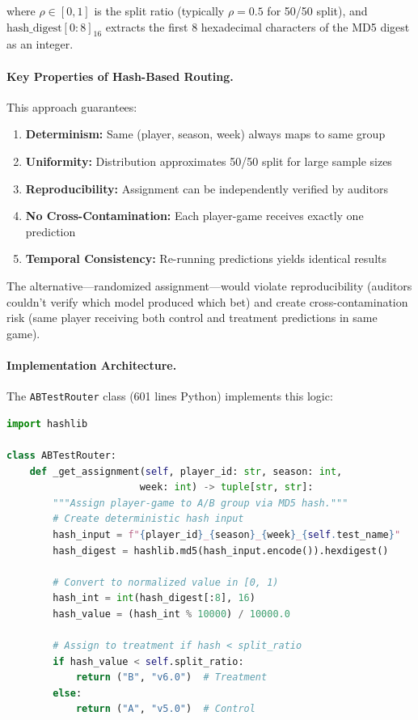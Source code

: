 where $\rho \in [0, 1]$ is the split ratio (typically $\rho = 0.5$ for 50/50 split), and $\text{hash\_digest}[0:8]_{16}$ extracts the first 8 hexadecimal characters of the MD5 digest as an integer.

\paragraph{Key Properties of Hash-Based Routing.}
This approach guarantees:

\begin{enumerate}[itemsep=2pt,parsep=0pt]
    \item \textbf{Determinism:} Same (player, season, week) always maps to same group
    \item \textbf{Uniformity:} Distribution approximates 50/50 split for large sample sizes
    \item \textbf{Reproducibility:} Assignment can be independently verified by auditors
    \item \textbf{No Cross-Contamination:} Each player-game receives exactly one prediction
    \item \textbf{Temporal Consistency:} Re-running predictions yields identical results
\end{enumerate}

The alternative---randomized assignment---would violate reproducibility (auditors couldn't verify which model produced which bet) and create cross-contamination risk (same player receiving both control and treatment predictions in same game).

\paragraph{Implementation Architecture.}
The \texttt{ABTestRouter} class (601 lines Python) implements this logic:

\begin{lstlisting}[language=Python, style=codestyle, caption={Deterministic A/B test assignment via MD5 hashing}]
import hashlib

class ABTestRouter:
    def _get_assignment(self, player_id: str, season: int,
                       week: int) -> tuple[str, str]:
        """Assign player-game to A/B group via MD5 hash."""
        # Create deterministic hash input
        hash_input = f"{player_id}_{season}_{week}_{self.test_name}"
        hash_digest = hashlib.md5(hash_input.encode()).hexdigest()

        # Convert to normalized value in [0, 1)
        hash_int = int(hash_digest[:8], 16)
        hash_value = (hash_int % 10000) / 10000.0

        # Assign to treatment if hash < split_ratio
        if hash_value < self.split_ratio:
            return ("B", "v6.0")  # Treatment
        else:
            return ("A", "v5.0")  # Control
\end{lstlisting}

